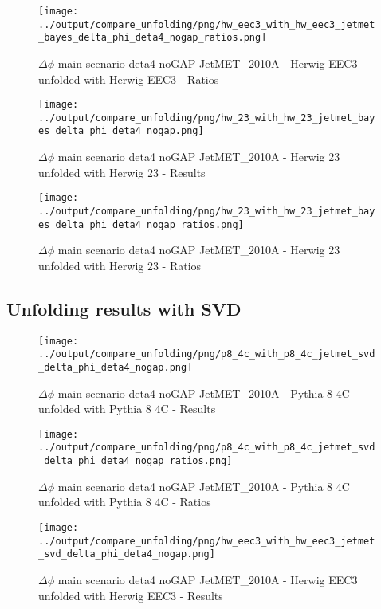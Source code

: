 \documentclass[11pt]{book}
\begin{document}
\begin{figure}[ht]
\centering
\texttt{[image: ../output/compare\_unfolding/png/hw\_eec3\_with\_hw\_eec3\_jetmet\_bayes\_delta\_phi\_deta4\_nogap\_ratios.png]}
\caption{$\Delta\phi$ main scenario deta4 noGAP JetMET\_2010A - Herwig EEC3 unfolded with Herwig EEC3 - Ratios}
\label{hw_eec3_hw_eec3_jetmet_bayes_delta_phi_deta4_nogap_b}
\end{figure}

\begin{figure}[ht]
\centering
\texttt{[image: ../output/compare\_unfolding/png/hw\_23\_with\_hw\_23\_jetmet\_bayes\_delta\_phi\_deta4\_nogap.png]}
\caption{$\Delta\phi$ main scenario deta4 noGAP JetMET\_2010A - Herwig 23 unfolded with Herwig 23 - Results}
\label{hw_23_hw_23_jetmet_bayes_delta_phi_deta4_nogap_a}
\end{figure}

\begin{figure}[ht]
\centering
\texttt{[image: ../output/compare\_unfolding/png/hw\_23\_with\_hw\_23\_jetmet\_bayes\_delta\_phi\_deta4\_nogap\_ratios.png]}
\caption{$\Delta\phi$ main scenario deta4 noGAP JetMET\_2010A - Herwig 23 unfolded with Herwig 23 - Ratios}
\label{hw_23_hw_23_jetmet_bayes_delta_phi_deta4_nogap_b}
\end{figure}


\clearpage
\subsection{Unfolding results with SVD}

\begin{figure}[ht]
\centering
\texttt{[image: ../output/compare\_unfolding/png/p8\_4c\_with\_p8\_4c\_jetmet\_svd\_delta\_phi\_deta4\_nogap.png]}
\caption{$\Delta\phi$ main scenario deta4 noGAP JetMET\_2010A - Pythia 8 4C unfolded with Pythia 8 4C - Results}
\label{p8_p8_jetmet_svd_delta_phi_deta4_nogap_a}
\end{figure}

\begin{figure}[ht]
\centering
\texttt{[image: ../output/compare\_unfolding/png/p8\_4c\_with\_p8\_4c\_jetmet\_svd\_delta\_phi\_deta4\_nogap\_ratios.png]}
\caption{$\Delta\phi$ main scenario deta4 noGAP JetMET\_2010A - Pythia 8 4C unfolded with Pythia 8 4C - Ratios}
\label{p8_p8_jetmet_svd_delta_phi_deta4_nogap_b}
\end{figure}

\begin{figure}[ht]
\centering
\texttt{[image: ../output/compare\_unfolding/png/hw\_eec3\_with\_hw\_eec3\_jetmet\_svd\_delta\_phi\_deta4\_nogap.png]}
\caption{$\Delta\phi$ main scenario deta4 noGAP JetMET\_2010A - Herwig EEC3 unfolded with Herwig EEC3 - Results}
\label{hw_eec3_hw_eec3_jetmet_svd_delta_phi_deta4_nogap_a}
\end{figure}
\end{document}
